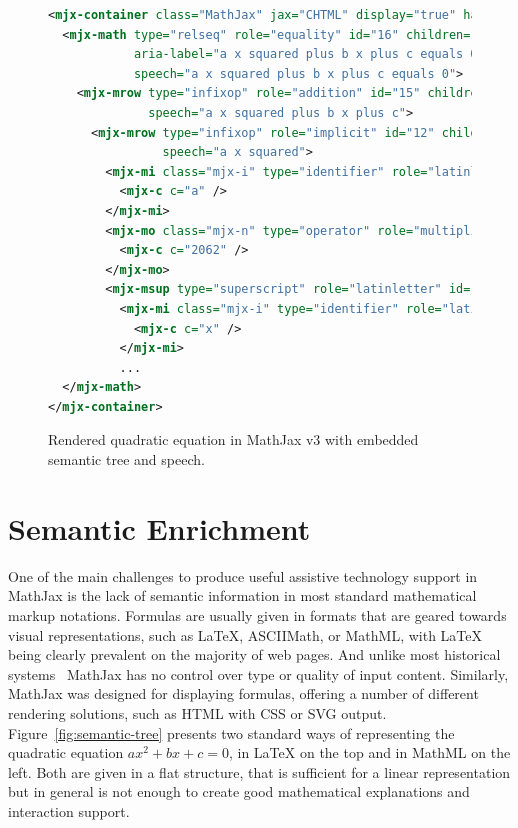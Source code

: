 \documentclass{sig-alternate}
\begin{document}
\begin{figure}[ht!]
  \begin{lstlisting}[language=XML,basicstyle=\scriptsize\tt]
<mjx-container class="MathJax" jax="CHTML" display="true" hasspeech="true" tabindex="1">
  <mjx-math type="relseq" role="equality" id="16" children="15,10" content="9"
            aria-label="a x squared plus b x plus c equals 0" 
            speech="a x squared plus b x plus c equals 0">
    <mjx-mrow type="infixop" role="addition" id="15" children="12,14,8" content="4,7" parent="16"
              speech="a x squared plus b x plus c">
      <mjx-mrow type="infixop" role="implicit" id="12" children="0,3" content="11" parent="15"
                speech="a x squared">
        <mjx-mi class="mjx-i" type="identifier" role="latinletter" font="italic" id="0" parent="12" speech="a">
          <mjx-c c="a" />
        </mjx-mi>
        <mjx-mo class="mjx-n" type="operator" role="multiplication" id="11" parent="12" speech="times">
          <mjx-c c="2062" />
        </mjx-mo>
        <mjx-msup type="superscript" role="latinletter" id="3" children="1,2" parent="12" speech="x squared">
          <mjx-mi class="mjx-i" type="identifier" role="latinletter" font="italic" id="1" parent="3" speech="x">
            <mjx-c c="x" />
          </mjx-mi>
          ...
  </mjx-math>
</mjx-container>
\end{lstlisting}
\caption{Rendered quadratic equation in MathJax v3 with embedded
  semantic tree and speech.}
\label{fig:rendered}
\end{figure}



\section{Semantic Enrichment}
\label{sec:semantic-enrichment}

One of the main challenges to produce useful assistive technology support in
MathJax is the lack of semantic information in most standard mathematical markup
notations. Formulas are usually given in formats that are geared towards visual
representations, such as {\LaTeX}, ASCIIMath, or MathML, with {\LaTeX} being
clearly prevalent on the majority of web pages. And unlike most historical
systems~\cite{karshmer2007mathematics} MathJax has no control over type or
quality of input content. Similarly, MathJax was designed for displaying
formulas, offering a number of different rendering solutions, such as HTML with
CSS or SVG output.  Figure~\ref{fig:semantic-tree} presents two standard ways of
representing the quadratic equation $ax^2 + bx + c = 0$, in {\LaTeX} on the top
and in MathML on the left. Both are given in a flat structure, that is
sufficient for a linear representation but in general is not enough to create
good mathematical explanations and interaction support.
\end{document}
